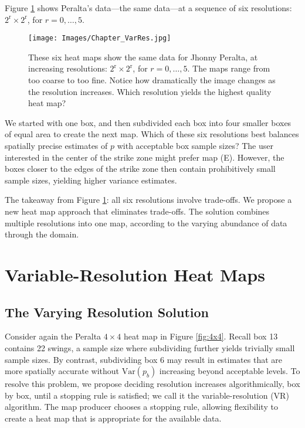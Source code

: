 Figure \ref{fig:6res} shows Peralta's data---the same data---at a sequence of six resolutions: $2^{\text{r}}\times 2^{\text{r}}$, for $r = 0, \dots, 5$.
        \begin{figure}[H]
      	\centering
      	\texttt{[image: Images/Chapter\_VarRes.jpg]} 
      	\caption{These six heat maps show the same data for Jhonny Peralta, at increasing resolutions: $2^{\text{r}}\times 2^{\text{r}}$, for $r = 0, \dots, 5$. The maps range from too coarse to too fine. Notice how dramatically the image changes as the resolution increases. Which resolution yields the highest quality heat map?}
      	\label{fig:6res}
      	\end{figure} 
We started with one box, and then subdivided each box into four smaller boxes of equal area to create the next map. Which of these six resolutions best balances spatially precise estimates of $p$ with acceptable box sample sizes? The user interested in the center of the strike zone might prefer map (E). However, the boxes closer to the edges of the strike zone then contain prohibitively small sample sizes, yielding higher variance estimates. 

The takeaway from Figure \ref{fig:6res}: all six resolutions involve trade-offs. We propose a new heat map approach that eliminates trade-offs. The solution combines multiple resolutions into one map, according to the varying abundance of data through the domain.

\section{Variable-Resolution Heat Maps} \label{VRHM}

\subsection{The Varying Resolution Solution}

Consider again the Peralta $4 \times 4$ heat map in Figure \ref{fig:4x4}. Recall box 13 contains 22 swings, a sample size where subdividing further yields trivially small sample sizes. By contrast, subdividing box 6 may result in estimates that are more spatially accurate without $\text{Var}(p_{b})$ increasing beyond acceptable levels. To resolve this problem, we propose deciding resolution increases algorithmically, box by box, until a stopping rule is satisfied; we call it the variable-resolution (VR) algorithm. The map producer chooses a stopping rule, allowing flexibility to create a heat map that is appropriate for the available data. 

